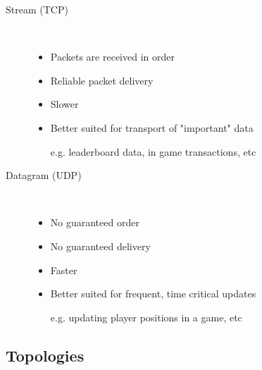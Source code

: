 \documentclass[a4paper]{article}
\begin{document}
\begin{description}
  \item[Stream (TCP)] \hfill \\
    \begin{itemize}
      \item
        Packets are received in order

      \item
        Reliable packet delivery

      \item
        Slower

      \item
        Better suited for transport of "important" data

        e.g. leaderboard data, in game transactions, etc

    \end{itemize}

  \item[Datagram (UDP)] \hfill \\
    \begin{itemize}
      \item
        No guaranteed order

      \item
        No guaranteed delivery

      \item
        Faster

      \item
        Better suited for frequent, time critical updates

        e.g. updating player positions in a game, etc

    \end{itemize}

\end{description}

\subsection{Topologies}
\end{document}
